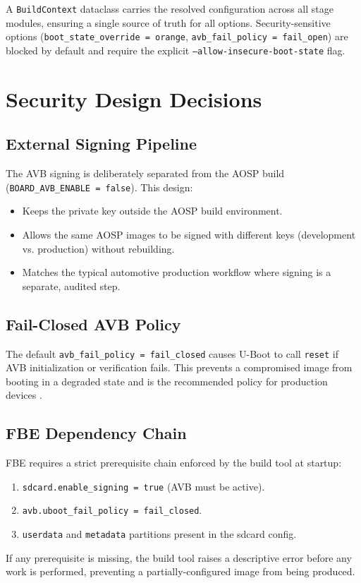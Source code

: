 A \texttt{BuildContext} dataclass carries the resolved configuration across all stage modules, ensuring a single source of truth for all options. Security-sensitive options (\texttt{boot\_state\_override = orange}, \texttt{avb\_fail\_policy = fail\_open}) are blocked by default and require the explicit \texttt{--allow-insecure-boot-state} flag.

\section{Security Design Decisions}
\label{sec:arch_security}

\subsection{External Signing Pipeline}

The AVB signing is deliberately separated from the AOSP build
(\texttt{BOARD\_AVB\_ENABLE = false}). This design:
\begin{itemize}
    \item Keeps the private key outside the AOSP build environment.
    \item Allows the same AOSP images to be signed with different keys (development vs. production) without rebuilding.
    \item Matches the typical automotive production workflow where signing is a separate,
    audited step.
\end{itemize}

\subsection{Fail-Closed AVB Policy}

The default \texttt{avb\_fail\_policy = fail\_closed} causes U-Boot to call \texttt{reset} if AVB initialization or verification fails. This prevents a compromised image from booting in a degraded state and is the recommended policy for production devices \cite{avb2_readme}.

\subsection{FBE Dependency Chain}

FBE requires a strict prerequisite chain enforced by the build tool at startup:
\begin{enumerate}
    \item \texttt{sdcard.enable\_signing = true} (AVB must be active).
    \item \texttt{avb.uboot\_fail\_policy = fail\_closed}.
    \item \texttt{userdata} and \texttt{metadata} partitions present in the sdcard config.
\end{enumerate}
If any prerequisite is missing, the build tool raises a descriptive error before any work is performed, preventing a partially-configured image from being produced.
